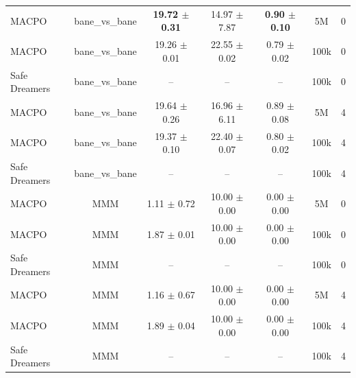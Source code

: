 \begin{longtable}{lcccccc}
\midrule
MACPO & bane\_vs\_bane & \textbf{19.72 $\pm$ 0.31} & 14.97 $\pm$ 7.87 & \textbf{0.90 $\pm$ 0.10} & 5M & 0 \\
MACPO & bane\_vs\_bane & 19.26 $\pm$ 0.01 & 22.55 $\pm$ 0.02 & 0.79 $\pm$ 0.02 & 100k & 0 \\
Safe Dreamers & bane\_vs\_bane & -- & -- & -- & 100k & 0 \\
\midrule
MACPO & bane\_vs\_bane & 19.64 $\pm$ 0.26 & 16.96 $\pm$ 6.11 & 0.89 $\pm$ 0.08 & 5M & 4 \\
MACPO & bane\_vs\_bane & 19.37 $\pm$ 0.10 & 22.40 $\pm$ 0.07 & 0.80 $\pm$ 0.02 & 100k & 4 \\
Safe Dreamers & bane\_vs\_bane & -- & -- & -- & 100k & 4 \\
\midrule
MACPO & MMM & 1.11 $\pm$ 0.72 & 10.00 $\pm$ 0.00 & 0.00 $\pm$ 0.00 & 5M & 0 \\
MACPO & MMM & 1.87 $\pm$ 0.01 & 10.00 $\pm$ 0.00 & 0.00 $\pm$ 0.00 & 100k & 0 \\
Safe Dreamers & MMM & -- & -- & -- & 100k & 0 \\
\midrule
MACPO & MMM & 1.16 $\pm$ 0.67 & 10.00 $\pm$ 0.00 & 0.00 $\pm$ 0.00 & 5M & 4 \\
MACPO & MMM & 1.89 $\pm$ 0.04 & 10.00 $\pm$ 0.00 & 0.00 $\pm$ 0.00 & 100k & 4 \\
Safe Dreamers & MMM & -- & -- & -- & 100k & 4 \\
\midrule
\end{longtable}
